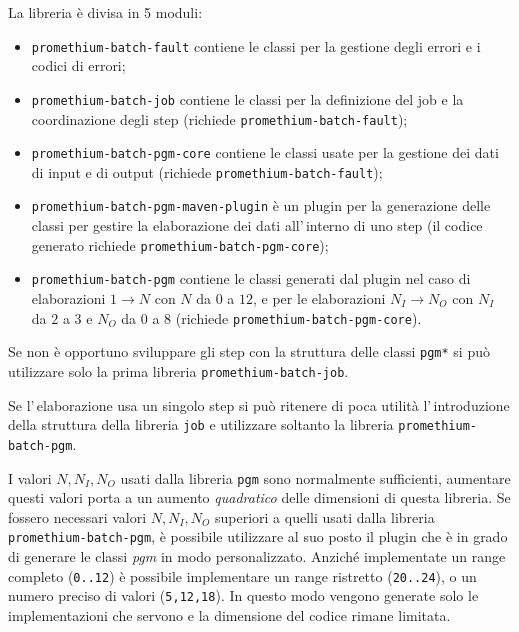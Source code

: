 La libreria è divisa in 5 moduli:
\begin{itemize}
\item \texttt{promethium-batch-fault} contiene le classi per la gestione degli
  errori e i codici di errori;
\item \texttt{promethium-batch-job} contiene le classi per la definizione del
  job e la coordinazione degli step (richiede \texttt{promethium-batch-fault});
\item \texttt{promethium-batch-pgm-core} contiene le classi usate per la gestione
  dei dati di input e di output (richiede \texttt{promethium-batch-fault});
\item \texttt{promethium-batch-pgm-maven-plugin} è un plugin per la generazione
  delle classi per gestire la elaborazione dei dati all'\,interno di uno step
  (il codice generato richiede \texttt{promethium-batch-pgm-core});
\item \texttt{promethium-batch-pgm} contiene le classi generati dal plugin
  nel caso di elaborazioni $1 \to N$ con $N$ da $0$ a $12$, e per le
  elaborazioni $N_I \to N_O$ con $N_I$ da $2$ a $3$ e $N_O$ da $0$ a $8$
  (richiede \texttt{promethium-batch-pgm-core}).
\end{itemize}

Se non è opportuno sviluppare gli step con la struttura delle classi
\verb!pgm*! si può utilizzare solo la prima libreria
\texttt{promethium-batch-job}.

Se l'\,elaborazione usa un singolo step si può ritenere di poca utilità
l'\,introduzione della struttura della libreria \verb!job! e utilizzare soltanto
la libreria \texttt{promethium-batch-pgm}.

I valori $N, N_I, N_O$ usati dalla libreria \verb!pgm! sono normalmente
sufficienti, aumentare questi valori porta a un aumento \textsl{quadratico}
delle dimensioni di questa libreria.
Se fossero necessari valori $N, N_I, N_O$ superiori a quelli usati dalla
libreria \texttt{promethium-batch-pgm}, è possibile utilizzare al suo posto il
plugin che è in grado di generare le classi \textsl{pgm} in modo personalizzato.
Anziché implementate un range completo (\texttt{0..12}) è possibile implementare
un range ristretto (\texttt{20..24}), o un numero preciso di valori
(\texttt{5,12,18}).
In questo modo vengono generate solo le implementazioni che servono e la
dimensione del codice rimane limitata.
